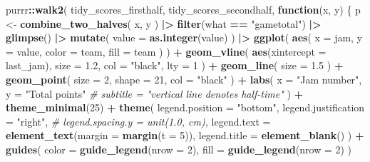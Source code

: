 \documentclass[
]{article}
\newenvironment{Shaded}{\begin{snugshade}}{\end{snugshade}}
\newcommand{\AttributeTok}[1]{\textcolor[rgb]{0.13,0.29,0.53}{#1}}
\newcommand{\CommentTok}[1]{\textcolor[rgb]{0.56,0.35,0.01}{\textit{#1}}}
\newcommand{\ControlFlowTok}[1]{\textcolor[rgb]{0.13,0.29,0.53}{\textbf{#1}}}
\newcommand{\DecValTok}[1]{\textcolor[rgb]{0.00,0.00,0.81}{#1}}
\newcommand{\FloatTok}[1]{\textcolor[rgb]{0.00,0.00,0.81}{#1}}
\newcommand{\FunctionTok}[1]{\textcolor[rgb]{0.13,0.29,0.53}{\textbf{#1}}}
\newcommand{\NormalTok}[1]{#1}
\newcommand{\OtherTok}[1]{\textcolor[rgb]{0.56,0.35,0.01}{#1}}
\newcommand{\SpecialCharTok}[1]{\textcolor[rgb]{0.81,0.36,0.00}{\textbf{#1}}}
\newcommand{\StringTok}[1]{\textcolor[rgb]{0.31,0.60,0.02}{#1}}
\begin{document}
\begin{Shaded}
\begin{Highlighting}[]
\NormalTok{purrr}\SpecialCharTok{::}\FunctionTok{walk2}\NormalTok{(}
\NormalTok{  tidy\_scores\_firsthalf,}
\NormalTok{  tidy\_scores\_secondhalf,}
  \ControlFlowTok{function}\NormalTok{(x, y) \{}
\NormalTok{    p }\OtherTok{\textless{}{-}} \FunctionTok{combine\_two\_halves}\NormalTok{(}
\NormalTok{      x, y}
\NormalTok{    ) }\SpecialCharTok{|\textgreater{}} 
      \FunctionTok{filter}\NormalTok{(what }\SpecialCharTok{==} \StringTok{"gametotal"}\NormalTok{) }\SpecialCharTok{|\textgreater{}} 
      \FunctionTok{glimpse}\NormalTok{() }\SpecialCharTok{|\textgreater{}} 
      \FunctionTok{mutate}\NormalTok{(}
        \AttributeTok{value =} \FunctionTok{as.integer}\NormalTok{(value)}
\NormalTok{      ) }\SpecialCharTok{|\textgreater{}} 
      \FunctionTok{ggplot}\NormalTok{(}
        \FunctionTok{aes}\NormalTok{(}
          \AttributeTok{x =}\NormalTok{ jam, }\AttributeTok{y =}\NormalTok{ value, }
          \AttributeTok{color =}\NormalTok{ team, }\AttributeTok{fill =}\NormalTok{ team}
\NormalTok{        )}
\NormalTok{      ) }\SpecialCharTok{+}
      \FunctionTok{geom\_vline}\NormalTok{(}
        \FunctionTok{aes}\NormalTok{(}\AttributeTok{xintercept =}\NormalTok{ last\_jam),}
        \AttributeTok{size =} \FloatTok{1.2}\NormalTok{,}
        \AttributeTok{col =} \StringTok{"black"}\NormalTok{,}
        \AttributeTok{lty =} \DecValTok{1}
\NormalTok{      ) }\SpecialCharTok{+}
      \FunctionTok{geom\_line}\NormalTok{(}
        \AttributeTok{size =} \FloatTok{1.5}
\NormalTok{      ) }\SpecialCharTok{+}
      \FunctionTok{geom\_point}\NormalTok{(}
        \AttributeTok{size =} \DecValTok{2}\NormalTok{,}
        \AttributeTok{shape =} \DecValTok{21}\NormalTok{,}
        \AttributeTok{col =} \StringTok{"black"}
\NormalTok{      ) }\SpecialCharTok{+}
      \FunctionTok{labs}\NormalTok{(}
        \AttributeTok{x =} \StringTok{"Jam number"}\NormalTok{,}
        \AttributeTok{y =} \StringTok{"Total points"}
        \CommentTok{\# subtitle = "vertical line denotes half{-}time"}
\NormalTok{      ) }\SpecialCharTok{+}
      \FunctionTok{theme\_minimal}\NormalTok{(}\DecValTok{25}\NormalTok{) }\SpecialCharTok{+}
      \FunctionTok{theme}\NormalTok{(}
        \AttributeTok{legend.position =} \StringTok{"bottom"}\NormalTok{,}
        \AttributeTok{legend.justification =} \StringTok{"right"}\NormalTok{,}
        \CommentTok{\# legend.spacing.y = unit(1.0, \textquotesingle{}cm\textquotesingle{}),}
        \AttributeTok{legend.text =} \FunctionTok{element\_text}\NormalTok{(}\AttributeTok{margin =} \FunctionTok{margin}\NormalTok{(}\AttributeTok{t =} \DecValTok{5}\NormalTok{)),}
        \AttributeTok{legend.title =} \FunctionTok{element\_blank}\NormalTok{()}
\NormalTok{      ) }\SpecialCharTok{+}
      \FunctionTok{guides}\NormalTok{(}
        \AttributeTok{color =} \FunctionTok{guide\_legend}\NormalTok{(}\AttributeTok{nrow =} \DecValTok{2}\NormalTok{),}
        \AttributeTok{fill =} \FunctionTok{guide\_legend}\NormalTok{(}\AttributeTok{nrow =} \DecValTok{2}\NormalTok{)}
\NormalTok{      )}
    

\end{Highlighting}
\end{Shaded}
\end{document}
